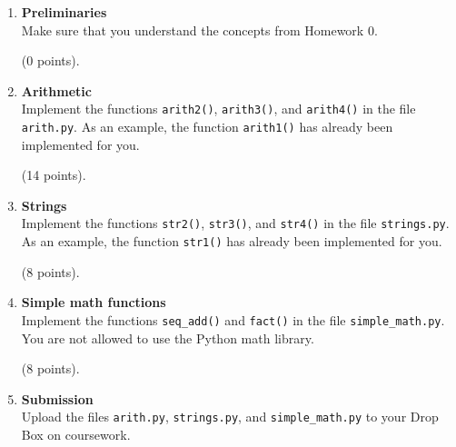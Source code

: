 \documentclass{article}
\newcounter{points}
\newcommand\setpoints[1]{\addtocounter{points}{#1}(#1 points)}
\begin{document}
\begin{enumerate}

\item \textbf{Preliminaries} \\
 Make sure that you understand the concepts from Homework 0. \setpoints{0}.







\item \textbf{Arithmetic} \\
Implement the functions \texttt{arith2()}, \texttt{arith3()}, and \texttt{arith4()} in the file \texttt{arith.py}.  As an example, the function \texttt{arith1()} has already been implemented for you.  \setpoints{14}.

\item \textbf{Strings} \\
Implement the functions \texttt{str2()}, \texttt{str3()}, and \texttt{str4()} in the file \texttt{strings.py}.  As an example, the function \texttt{str1()} has already been implemented for you. \setpoints{8}.

\item \textbf{Simple math functions} \\
Implement the functions \texttt{seq\_add()} and \texttt{fact()} in the file \texttt{simple\_math.py}.  You are not allowed to use the Python math library. \setpoints{8}.

\item \textbf{Submission} \\
Upload the files \texttt{arith.py}, \texttt{strings.py}, and \texttt{simple\_math.py} to your Drop Box on coursework.
\end{enumerate}
\end{document}
